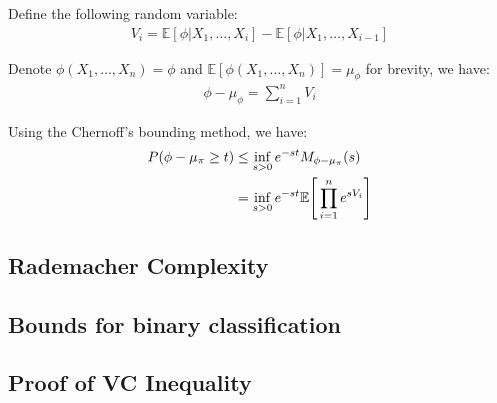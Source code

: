 \begin{proof*}
    Define the following random variable:
    \begin{align*}
        V_i = \mathbb{E}[\phi|X_1, \dots, X_i] - \mathbb{E}[\phi|X_1, \dots, X_{i-1}]
    \end{align*}

    \noindent Denote $\phi(X_1, \dots, X_n)=\phi$ and $\mathbb{E}[\phi(X_1, \dots, X_n)] = \mu_\phi$ for brevity, we have:
    \begin{align*}
        \phi - \mu_\phi = \sum_{i=1}^n V_i
    \end{align*}

    \noindent Using the Chernoff's bounding method, we have:
    \begin{align*}
        P(\phi - \mu_\pi \ge t) 
            &\le \inf_{s>0}e^{-st}M_{\phi-\mu_\pi}(s) \\
            &= \inf_{s>0}e^{-st}\mathbb{E}\Bigg[ 
                \prod_{i=1}^n e^{sV_i}
             \Bigg]
    \end{align*}
\end{proof*}

\subsection{Rademacher Complexity}




\subsection{Bounds for binary classification}




\subsection{Proof of VC Inequality}
\label{sec:proof_of_vc_inequality}
